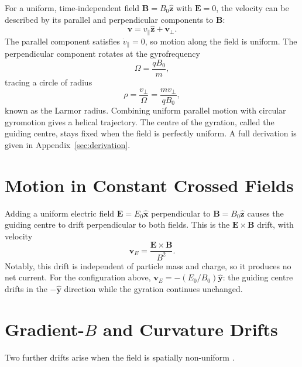 For a uniform, time-independent field $\mathbf{B} = B_0\hat{\mathbf{z}}$
with $\mathbf{E} = 0$, the velocity can be described by its parallel and
perpendicular components to $\mathbf{B}$:
\begin{equation}
  \mathbf{v} = v_\parallel \hat{\mathbf{z}} + \mathbf{v}_\perp.
  \label{eq:v_decomp}
\end{equation}
The parallel component satisfies $\dot{v}_\parallel = 0$, so motion
along the field is uniform. The perpendicular component rotates at the
gyrofrequency
\begin{equation}
  \Omega = \frac{qB_0}{m},
  \label{eq:gyrofreq}
\end{equation}
tracing a circle of radius
\begin{equation}
  \rho = \frac{v_\perp}{\Omega} = \frac{mv_\perp}{qB_0},
  \label{eq:larmor}
\end{equation}
known as the Larmor radius. Combining uniform parallel motion with
circular gyromotion gives a helical trajectory. The centre of the
gyration, called the guiding centre, stays fixed when the field is
perfectly uniform. A full derivation is given in Appendix~\ref{sec:derivation}.

\section{Motion in Constant Crossed Fields}
\label{sec:exb}

Adding a uniform electric field $\mathbf{E} = E_0\hat{\mathbf{x}}$
perpendicular to $\mathbf{B} = B_0\hat{\mathbf{z}}$ causes the guiding
centre to drift perpendicular to both fields. This is the
$\mathbf{E} \times \mathbf{B}$ drift, with velocity
\begin{equation}
  \mathbf{v}_E = \frac{\mathbf{E} \times \mathbf{B}}{B^2}.
  \label{eq:exb}
\end{equation}
Notably, this drift is independent of particle mass and charge, so it
produces no net current. For the configuration above,
$\mathbf{v}_E = -(E_0/B_0)\hat{\mathbf{y}}$: the guiding centre drifts
in the $-\hat{\mathbf{y}}$ direction while the gyration continues
unchanged.

\section{Gradient-\texorpdfstring{$B$}{B} and Curvature Drifts}
\label{sec:drifts}

Two further drifts arise when the field is spatially non-uniform
\citep{boyd2003}.

